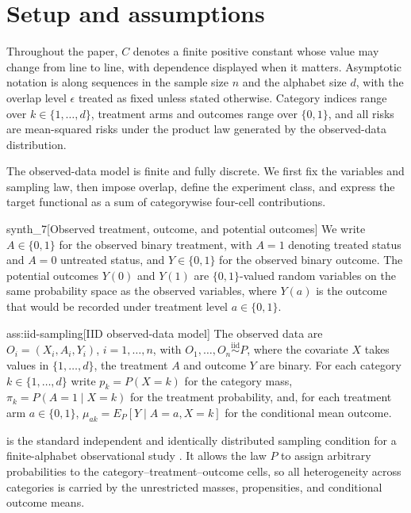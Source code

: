 \section{Setup and assumptions}

Throughout the paper, \(C\) denotes a finite positive constant whose value may change from line to line, with dependence displayed when it matters. Asymptotic notation is along sequences in the sample size \(n\) and the alphabet size \(d\), with the overlap level \(\epsilon\) treated as fixed unless stated otherwise. Category indices range over \(k\in\{1,\ldots,d\}\), treatment arms and outcomes range over \(\{0,1\}\), and all risks are mean-squared risks under the product law generated by the observed-data distribution.

The observed-data model is finite and fully discrete. We first fix the variables and sampling law, then impose overlap, define the experiment class, and express the target functional as a sum of categorywise four-cell contributions.

\begin{definitionv}{synth_7}[Observed treatment, outcome, and potential outcomes]
We write \(A\in\{0,1\}\) for the observed binary treatment, with \(A=1\) denoting treated status and \(A=0\) untreated status, and \(Y\in\{0,1\}\) for the observed binary outcome. The potential outcomes \(Y(0)\) and \(Y(1)\) are \(\{0,1\}\)-valued random variables on the same probability space as the observed variables, where \(Y(a)\) is the outcome that would be recorded under treatment level \(a\in\{0,1\}\).
\end{definitionv}

\begin{assumptionv}{ass:iid-sampling}[IID observed-data model]
The observed data are \(O_i=(X_i,A_i,Y_i)\), \(i=1,\ldots,n\), with \(O_1,\ldots,O_n\stackrel{\mathrm{iid}}{\sim}P\), where the covariate \(X\) takes values in \(\{1,\ldots,d\}\), the treatment \(A\) and outcome \(Y\) are binary. For each category \(k\in\{1,\ldots,d\}\) write \(p_k=P(X=k)\) for the category mass, \(\pi_k=P(A=1\mid X=k)\) for the treatment probability, and, for each treatment arm \(a\in\{0,1\}\), \(\mu_{ak}=E_P[Y\mid A=a,X=k]\) for the conditional mean outcome.
\end{assumptionv}

 is the standard independent and identically distributed sampling condition for a finite-alphabet observational study \citep{ZengBalakrishnanHanKennedy2024}. It allows the law \(P\) to assign arbitrary probabilities to the category--treatment--outcome cells, so all heterogeneity across categories is carried by the unrestricted masses, propensities, and conditional outcome means.

